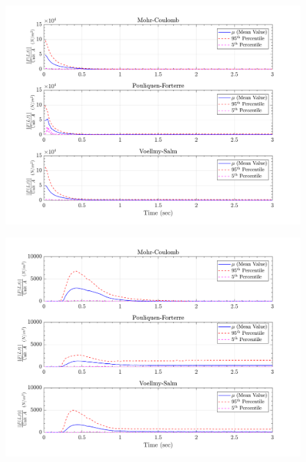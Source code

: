 \documentclass{article}
\begin{document}
\begin{figure}[H]
	\begin{minipage}[b]{0.5\linewidth}
    	\centering
    	\includegraphics[width=1\textwidth]{InclinedPlane/LocalRecords/Records/Ftotal_L1.png}
    	\label{fig:Ramp-L1-Ftot}
	\end{minipage}
	\begin{minipage}[b]{0.5\linewidth}
		\centering
		\includegraphics[width=1\textwidth]{InclinedPlane/LocalRecords/Records/Ftotal_L8.png}
    	\label{fig:Ramp-L2-Ftot}
    \end{minipage}
    

\end{figure}
\end{document}
